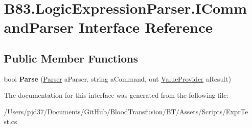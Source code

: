 \hypertarget{interface_b83_1_1_logic_expression_parser_1_1_i_command_parser}{}\section{B83.\+Logic\+Expression\+Parser.\+I\+Command\+Parser Interface Reference}
\label{interface_b83_1_1_logic_expression_parser_1_1_i_command_parser}
\subsection*{Public Member Functions}
\begin{DoxyCompactItemize}
\item 
bool {\bfseries Parse} (\hyperlink{class_b83_1_1_logic_expression_parser_1_1_parser}{Parser} a\+Parser, string a\+Command, out \hyperlink{class_b83_1_1_logic_expression_parser_1_1_value_provider}{Value\+Provider} a\+Result)\hypertarget{interface_b83_1_1_logic_expression_parser_1_1_i_command_parser_a847d41467ec71bbe20f604d4004e2f25}{}\label{interface_b83_1_1_logic_expression_parser_1_1_i_command_parser_a847d41467ec71bbe20f604d4004e2f25}

\end{DoxyCompactItemize}


The documentation for this interface was generated from the following file\+:\begin{DoxyCompactItemize}
\item 
/\+Users/pjd37/\+Documents/\+Git\+Hub/\+Blood\+Transfusion/\+B\+T/\+Assets/\+Scripts/Expr\+Test.\+cs\end{DoxyCompactItemize}
